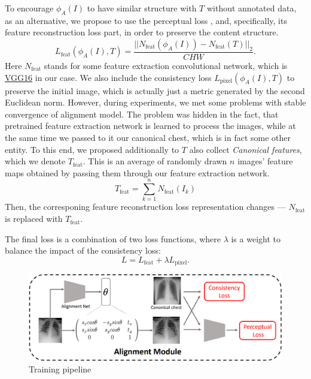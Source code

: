 \documentclass{article}
\begin{document}
To encourage $ \phi_A(I) $ to have similar structure with $ T $ without annotated 
 data, as an alternative, we propose to use the perceptual loss \cite{StyleTransfer},
 and, specifically, its feature reconstruction loss part, in order to preserve the
 content structure.
\begin{equation}
    L_{\text{feat}}(\phi_A(I), T) = \frac{|| N_{\text{feat}}(\phi_A(I)) -
    N_{\text{feat}}(T) ||_2}{CHW}.
\end{equation}
Here $ N_{\text{feat}} $ stands for some feature extraction convolutional network, 
 which is \href{https://pytorch.org/vision/stable/models/generated/torchvision.models.vgg16.html?highlight=vgg}{VGG16} 
 in our case. We also include the consistency loss $ L_{\text{pixel}}(\phi_A(I), T) $ to preserve the
 initial image, which is actually just a metric generated by the second Euclidean norm.
 However, during experiments, we met some problems with stable convergence of 
 alignment model. The problem was hidden in the fact, that pretrained feature 
 extraction network is learned to process the images, while at the same time we 
 passed to it our canonical chest, which is in fact some other entity. To this end,
 we proposed additionally to $ T $ also collect \textit{Canonical features}, which
 we denote $ T_{\text{feat}} $. This is an average of randomly drawn $ n $ images' feature 
 maps obtained by passing them through our feature extraction network.
\begin{equation}
    T_{\text{feat}} = \sum_{k = 1}^{n} N_{\text{feat}}(I_k) 
\end{equation}
Then, the corresponing feature reconstruction loss representation changes --- $N_{\text{feat}}$
is replaced with $T_{\text{feat}}$.

The final loss is a combination of two loss functions, where $ \lambda $ is a weight 
 to balance the impact of the consistency loss:
\begin{equation}
    L = L_{\text{feat}} + \lambda L_{\text{pixel}}.
\end{equation}

\begin{figure}[ht]\label{overall_architecture}
    \vskip 0.2in
    \begin{center}
    \centerline{\includegraphics[width=\columnwidth * 2]{../images/overall_pipeline.png}}
    \caption{Training pipeline}
    \end{center}
    \vskip -0.2in
\end{figure}
\end{document}
